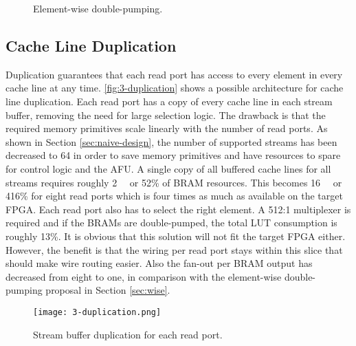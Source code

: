 \begin{figure}[htb!]
  {\caption{Element-wise double-pumping.}\label{fig:3-element-wise}}
\end{figure}



\subsection{Cache Line Duplication}
\label{sec:duplication}
Duplication guarantees that each read port has access to every element in every cache line at any time. \autoref{fig:3-duplication} shows a possible architecture for cache line duplication. Each read port has a copy of every cache line in each stream buffer, removing the need for large selection logic. The drawback is that the required memory primitives scale linearly with the number of read ports. As shown in Section \ref{sec:naive-design}, the number of supported streams has been decreased to 64 in order to save memory primitives and have resources to spare for control logic and the AFU. A single copy of all buffered cache lines for all streams requires roughly \SI{2}{\mega\byte} or 52\% of BRAM resources. This becomes \SI{16}{\mega\byte} or 416\% for eight read ports which is four times as much as available on the target FPGA. Each read port also has to select the right element. A 512:1 multiplexer is required and if the BRAMs are double-pumped, the total LUT consumption is roughly 13\%. It is obvious that this solution will not fit the target FPGA either. However, the benefit is that the wiring per read port stays within this slice that should make wire routing easier. Also the fan-out per BRAM output has decreased from eight to one, in comparison with the element-wise double-pumping proposal in Section \ref{sec:wise}.


\begin{figure}[H]
  \centering
  \texttt{[image: 3-duplication.png]}
  \caption{Stream buffer duplication for each read port.}
  \label{fig:3-duplication}
\end{figure}



